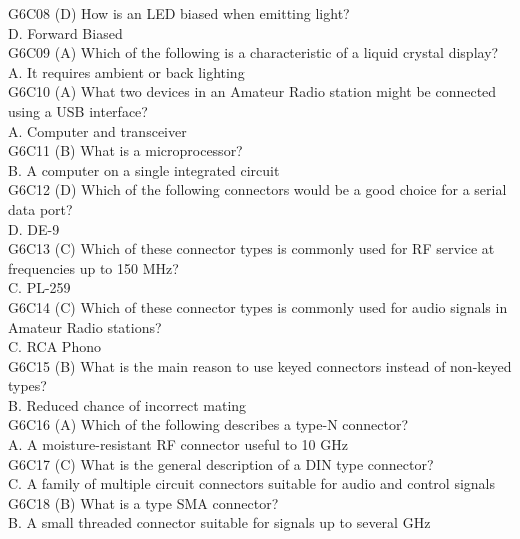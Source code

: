 \documentclass[12pt,letterpaper]{report}
\begin{document}
G6C08 (D) How is an LED biased when emitting light?\\
D. Forward Biased\\

G6C09 (A) Which of the following is a characteristic of a liquid crystal display?\\
A. It requires ambient or back lighting\\

G6C10 (A) What two devices in an Amateur Radio station might be connected using a USB interface?\\
A. Computer and transceiver\\

G6C11 (B) What is a microprocessor?\\
B. A computer on a single integrated circuit\\

G6C12 (D) Which of the following connectors would be a good choice for a serial data port?\\
D. DE-9\\

G6C13 (C) Which of these connector types is commonly used for RF service at frequencies up to 150 MHz? \\
C. PL-259\\

G6C14 (C) Which of these connector types is commonly used for audio signals in Amateur Radio stations? \\
C. RCA Phono\\

G6C15 (B) What is the main reason to use keyed connectors instead of non-keyed types?\\
B. Reduced chance of incorrect mating\\

G6C16 (A) Which of the following describes a type-N connector?\\
A. A moisture-resistant RF connector useful to 10 GHz\\

G6C17 (C) What is the general description of a DIN type connector?\\
C. A family of multiple circuit connectors suitable for audio and control signals\\

G6C18 (B) What is a type SMA connector?\\
B. A small threaded connector suitable for signals up to several GHz\\
\end{document}
